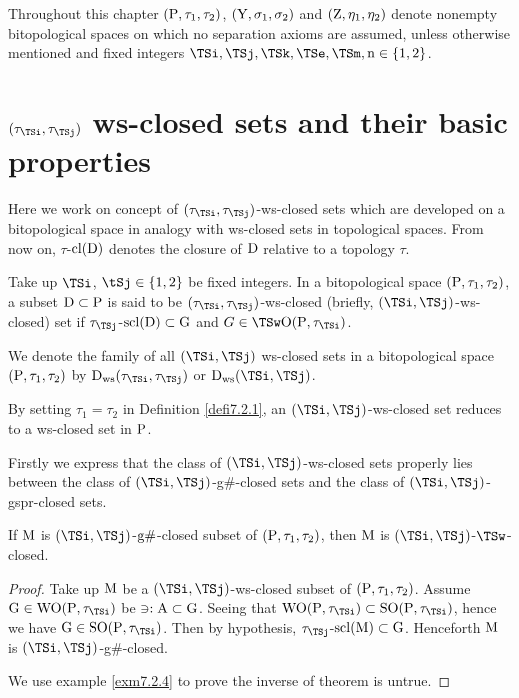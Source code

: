 Throughout this chapter $(\mathrm{P}, \tau_1 , \tau_2)$, $(\mathrm{Y}, \sigma_{1} , \sigma_{2} )$ and $(\mathrm{Z}, \eta_{1}, \eta_{2})$ denote nonempty bitopological spaces on which no separation axioms are assumed, unless otherwise mentioned and fixed integers $\TSi, \TSj, \TSk, \TSe, \TSm, \TSn\in \{1, 2\}$.

\section{$(\tau_{\TSi}, \tau_{\TSj})$ ws-closed sets and their basic properties}

Here we work on concept of $(\tau_{\TSi}, \tau_{\TSj})$-ws-closed sets which are developed on a bitopological space in analogy with ws-closed sets in topological spaces. From now on, $\tau$-$\mathrm{cl}(\mathrm{D})$ denotes the closure of $\mathrm{D}$ relative to a topology $\tau$.

\begin{dfn}\label{defi7.2.1}
Take up $\TSi$, $\tSj \in \{1, 2\}$ be fixed integers. In a bitopological space $(\mathrm{P}, \tau_1 , \tau_2)$, a subset $\mathrm{D} \subset \mathrm{P}$ is said to be $(\tau_{\TSi} , \tau_{\TSj})$-ws-closed (briefly, $(\TSi, \TSj)$-ws-closed) set if $\tau_{\TSj}$-$\mathrm{scl}(\mathrm{D}) \subset \mathrm{G}$ and $G \in \TSw\TSO(\TSP, \tau_{\TSi})$.
\end{dfn}

We denote the family of all $(\TSi, \TSj)$ ws-closed sets in a bitopological space $(\mathrm{P}, \tau_1 , \tau_2)$ by $\clrD_{\ws}(\tau_{\TSi} , \tau_{\TSj})$ or $\clrD_{\ws}(\TSi, \TSj)$.

\begin{rem}\label{rem7.2.2}
By setting $\tau_1 = \tau_2$ in Definition \ref{defi7.2.1}, an $(\TSi, \TSj)$-ws-closed set reduces to a ws-closed set in $\mathrm{P}$.
\end{rem}

Firstly we express that the class of $(\TSi, \TSj)$-ws-closed sets properly lies between the class of $(\TSi, \TSj)$-g\#-closed sets and the class of $(\TSi, \TSj)$-gspr-closed sets.

\begin{thm}\label{thm7.2.3}
If $\mathrm{M}$ is $(\TSi, \TSj)$-$\mathrm{g}\#$-closed subset of $(\mathrm{P}, \tau_1 , \tau_2)$, then $\mathrm{M}$ is $(\TSi, \TSj)$-$\TSw$-closed.
\end{thm}

\begin{proof}
Take up $\mathrm{M}$ be a $(\TSi, \TSj)$-ws-closed subset of $(\mathrm{P}, \tau_1 , \tau_2)$. Assume $\TSG\in \TSW\TSO(\TSP, \tau_{\TSi})$ be $\ni: \mathrm{A}\subset \mathrm{G}$. Seeing that $\TSW\TSO(\TSP, \tau_{\TSi}) \subset \TSS\TSO(\TSP, \tau_{\TSi})$, hence we have $\TSG\in\TSS\TSO(\TSP, \tau_{\TSi})$. Then by hypothesis, $\tau_{\TSj}$-$\mathrm{scl}(\mathrm{M}) \subset \mathrm{G}$. Henceforth $\mathrm{M}$ is $(\TSi, \TSj)$-g\#-closed.

We use example \ref{exm7.2.4} to prove the inverse of theorem is untrue.
\end{proof}

